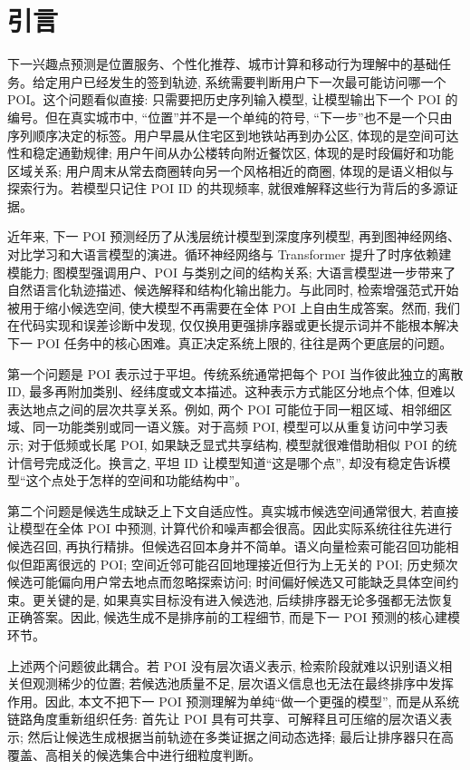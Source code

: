\documentclass[10pt,twocolumn,fontset=none]{ctexart}
\begin{document}
\section{引言}

下一兴趣点预测是位置服务、个性化推荐、城市计算和移动行为理解中的基础任务。给定用户已经发生的签到轨迹, 系统需要判断用户下一次最可能访问哪一个 POI。这个问题看似直接: 只需要把历史序列输入模型, 让模型输出下一个 POI 的编号。但在真实城市中, “位置”并不是一个单纯的符号, “下一步”也不是一个只由序列顺序决定的标签。用户早晨从住宅区到地铁站再到办公区, 体现的是空间可达性和稳定通勤规律; 用户午间从办公楼转向附近餐饮区, 体现的是时段偏好和功能区域关系; 用户周末从常去商圈转向另一个风格相近的商圈, 体现的是语义相似与探索行为。若模型只记住 POI ID 的共现频率, 就很难解释这些行为背后的多源证据。

近年来, 下一 POI 预测经历了从浅层统计模型到深度序列模型, 再到图神经网络、对比学习和大语言模型的演进。循环神经网络与 Transformer 提升了时序依赖建模能力; 图模型强调用户、POI 与类别之间的结构关系; 大语言模型进一步带来了自然语言化轨迹描述、候选解释和结构化输出能力。与此同时, 检索增强范式开始被用于缩小候选空间, 使大模型不再需要在全体 POI 上自由生成答案。然而, 我们在代码实现和误差诊断中发现, 仅仅换用更强排序器或更长提示词并不能根本解决下一 POI 任务中的核心困难。真正决定系统上限的, 往往是两个更底层的问题。

第一个问题是 POI 表示过于平坦。传统系统通常把每个 POI 当作彼此独立的离散 ID, 最多再附加类别、经纬度或文本描述。这种表示方式能区分地点个体, 但难以表达地点之间的层次共享关系。例如, 两个 POI 可能位于同一粗区域、相邻细区域、同一功能类别或同一语义簇。对于高频 POI, 模型可以从重复访问中学习表示; 对于低频或长尾 POI, 如果缺乏显式共享结构, 模型就很难借助相似 POI 的统计信号完成泛化。换言之, 平坦 ID 让模型知道“这是哪个点”, 却没有稳定告诉模型“这个点处于怎样的空间和功能结构中”。

第二个问题是候选生成缺乏上下文自适应性。真实城市候选空间通常很大, 若直接让模型在全体 POI 中预测, 计算代价和噪声都会很高。因此实际系统往往先进行候选召回, 再执行精排。但候选召回本身并不简单。语义向量检索可能召回功能相似但距离很远的 POI; 空间近邻可能召回地理接近但行为上无关的 POI; 历史频次候选可能偏向用户常去地点而忽略探索访问; 时间偏好候选又可能缺乏具体空间约束。更关键的是, 如果真实目标没有进入候选池, 后续排序器无论多强都无法恢复正确答案。因此, 候选生成不是排序前的工程细节, 而是下一 POI 预测的核心建模环节。

上述两个问题彼此耦合。若 POI 没有层次语义表示, 检索阶段就难以识别语义相关但观测稀少的位置; 若候选池质量不足, 层次语义信息也无法在最终排序中发挥作用。因此, 本文不把下一 POI 预测理解为单纯“做一个更强的模型”, 而是从系统链路角度重新组织任务: 首先让 POI 具有可共享、可解释且可压缩的层次语义表示; 然后让候选生成根据当前轨迹在多类证据之间动态选择; 最后让排序器只在高覆盖、高相关的候选集合中进行细粒度判断。
\end{document}
